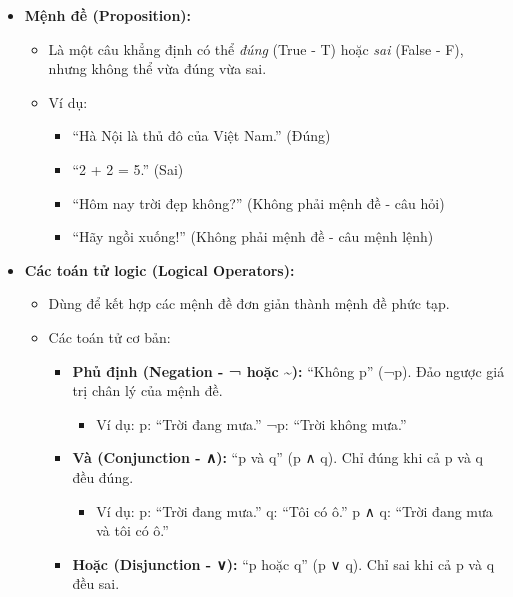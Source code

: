 \documentclass[11pt,a4paper]{article}
\begin{document}
\begin{itemize}
\item
  \textbf{Mệnh đề (Proposition):}

  \begin{itemize}
  \item
    Là một câu khẳng định có thể \emph{đúng} (True - T) hoặc \emph{sai} (False - F), nhưng không thể vừa đúng vừa sai.
  \item
    Ví dụ:

    \begin{itemize}
    \item
      ``Hà Nội là thủ đô của Việt Nam.'' (Đúng)
    \item
      ``2 + 2 = 5.'' (Sai)
    \item
      ``Hôm nay trời đẹp không?'' (Không phải mệnh đề - câu hỏi)
    \item
      ``Hãy ngồi xuống!'' (Không phải mệnh đề - câu mệnh lệnh)
    \end{itemize}
  \end{itemize}
\item
  \textbf{Các toán tử logic (Logical Operators):}

  \begin{itemize}
  \item
    Dùng để kết hợp các mệnh đề đơn giản thành mệnh đề phức tạp.
  \item
    Các toán tử cơ bản:

    \begin{itemize}
    \item
      \textbf{Phủ định (Negation - ¬ hoặc \textasciitilde):} ``Không p'' (¬p). Đảo ngược giá trị chân lý của mệnh đề.

      \begin{itemize}
      \item
        Ví dụ: p: ``Trời đang mưa.'' ¬p: ``Trời không mưa.''
      \end{itemize}
    \item
      \textbf{Và (Conjunction - ∧):} ``p và q'' (p ∧ q). Chỉ đúng khi cả p và q đều đúng.

      \begin{itemize}
      \item
        Ví dụ: p: ``Trời đang mưa.'' q: ``Tôi có ô.'' p ∧ q: ``Trời đang mưa và tôi có ô.''
      \end{itemize}
    \item
      \textbf{Hoặc (Disjunction - ∨):} ``p hoặc q'' (p ∨ q). Chỉ sai khi cả p và q đều sai.


\end{itemize}
\end{itemize}
\end{itemize}
\end{document}
